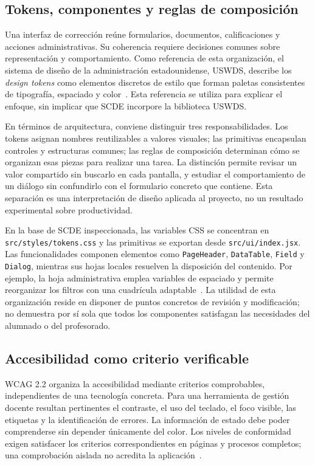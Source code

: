 \subsection{Tokens, componentes y reglas de composición}

Una interfaz de corrección reúne formularios, documentos, calificaciones y acciones
administrativas. Su coherencia requiere decisiones comunes sobre representación
y comportamiento. Como referencia de esta organización, el sistema de diseño de
la administración estadounidense, USWDS, describe los \textit{design tokens} como
elementos discretos de estilo que forman paletas consistentes de tipografía,
espaciado y color~\cite{codex_uswds_tokens}. Esta referencia se utiliza para
explicar el enfoque, sin implicar que SCDE incorpore la biblioteca USWDS.

En términos de arquitectura, conviene distinguir tres responsabilidades. Los
tokens asignan nombres reutilizables a valores visuales; las primitivas encapsulan
controles y estructuras comunes; las reglas de composición determinan cómo se
organizan esas piezas para realizar una tarea. La distinción permite revisar un
valor compartido sin buscarlo en cada pantalla, y estudiar el comportamiento de un
diálogo sin confundirlo con el formulario concreto que contiene. Esta separación
es una interpretación de diseño aplicada al proyecto, no un resultado experimental
sobre productividad.

En la base de SCDE inspeccionada, las variables CSS se concentran en
\texttt{src/styles/tokens.css} y las primitivas se exportan desde
\texttt{src/ui/index.jsx}. Las funcionalidades componen elementos como
\texttt{PageHeader}, \texttt{DataTable}, \texttt{Field} y \texttt{Dialog}, mientras
sus hojas locales resuelven la disposición del contenido. Por ejemplo, la hoja
administrativa emplea variables de espaciado y permite reorganizar los filtros
con una cuadrícula adaptable~\cite{codex_scde_design_evidence}. La utilidad de esta
organización reside en disponer de puntos concretos de revisión y modificación;
no demuestra por sí sola que todos los componentes satisfagan las necesidades
del alumnado o del profesorado.

\subsection{Accesibilidad como criterio verificable}

WCAG 2.2 organiza la accesibilidad mediante criterios comprobables, independientes
de una tecnología concreta. Para una herramienta de gestión docente resultan
pertinentes el contraste, el uso del teclado, el foco visible, las etiquetas y la
identificación de errores. La información de estado debe poder comprenderse sin
depender únicamente del color. Los niveles de conformidad exigen satisfacer los
criterios correspondientes en páginas y procesos completos; una comprobación
aislada no acredita la aplicación~\cite{codex_wcag22_ui}.

